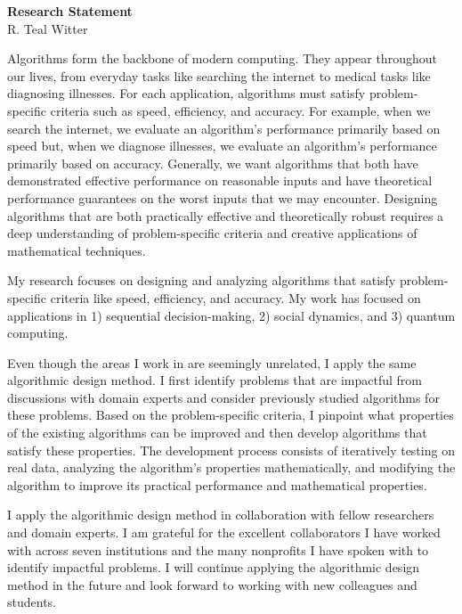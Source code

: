 \documentclass[11pt]{article}
\begin{document}
\begin{center}
	\Large \textbf{Research Statement} \\
	\vspace{.25em}
	\large{R. {\color{teal}Teal} Witter}
\end{center}

Algorithms form the backbone of modern computing.
They appear throughout our lives, from everyday tasks like searching the internet to medical tasks like diagnosing illnesses.
For each application, algorithms must satisfy problem-specific criteria such as speed, efficiency, and accuracy.
For example, when we search the internet, we evaluate an algorithm's performance primarily based on speed but, when we diagnose illnesses, we evaluate an algorithm's performance primarily based on accuracy.
Generally, we want algorithms that both have demonstrated effective performance on reasonable inputs and have theoretical performance guarantees on the worst inputs that we may encounter.
Designing algorithms that are both practically effective and theoretically robust requires a deep understanding of problem-specific criteria and creative applications of mathematical techniques.

My research focuses on designing and analyzing algorithms that satisfy problem-specific criteria like speed, efficiency, and accuracy.
My work has focused on applications in 1) sequential decision-making, 2) social dynamics, and 3) quantum computing.

Even though the areas I work in are seemingly unrelated, I apply the same algorithmic design method.
I first identify problems that are impactful from discussions with domain experts and consider previously studied algorithms for these problems.
Based on the problem-specific criteria, I pinpoint what properties of the existing algorithms can be improved and then develop algorithms that satisfy these properties.
The development process consists of iteratively testing on real data, analyzing the algorithm's properties mathematically, and modifying the algorithm to improve its practical performance and mathematical properties.

I apply the algorithmic design method in collaboration with fellow researchers and domain experts.
I am grateful for the excellent collaborators I have worked with across seven institutions and the many nonprofits I have spoken with to identify impactful problems.
I will continue applying the algorithmic design method in the future and look forward to working with new colleagues and students.
\end{document}
